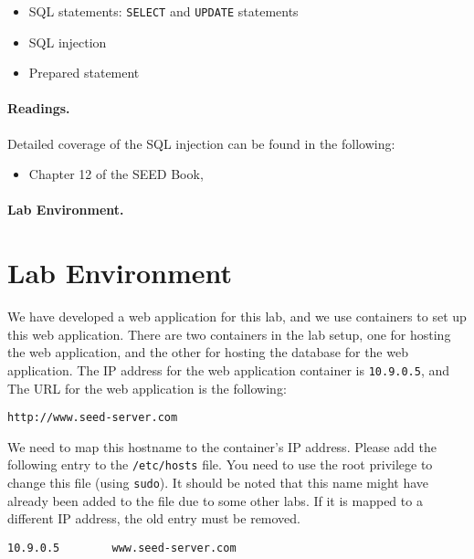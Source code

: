 \begin{itemize}[noitemsep]
\item SQL statements: \texttt{SELECT} and \texttt{UPDATE} statements
\item SQL injection
\item Prepared statement
\end{itemize}



\paragraph{Readings.}
Detailed coverage of the SQL injection can be found in the following:

\begin{itemize}
\item Chapter 12 of the SEED Book, \seedbook
\end{itemize}

\paragraph{Lab Environment.} 
\seedenvironmentB 
\nodependency


\section{Lab Environment}


We have developed a web application for this lab, and 
we use containers to set up this web application. There 
are two containers in the lab setup, one for hosting 
the web application, and the other for hosting the database 
for the web application. 
The IP address for the web application container is \texttt{10.9.0.5}, and 
The URL for the web application is the following:

\begin{lstlisting}
http://www.seed-server.com
\end{lstlisting}
 
We need to map this hostname to the container's IP address. Please 
add the following entry to the \texttt{/etc/hosts} file. 
You need to use the root privilege to
change this file (using \texttt{sudo}).
It should be noted
that this name might have already been added to the file due to
some other labs. If it is mapped to a different IP address,
the old entry must be removed.

\begin{lstlisting}
10.9.0.5        www.seed-server.com
\end{lstlisting}
 

